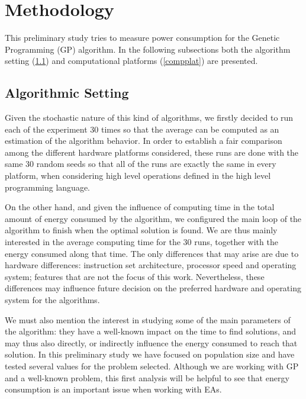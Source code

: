 \section{Methodology}
\label{methodology}

This preliminary study tries to measure power consumption for 
the Genetic Programming (GP) algorithm. In the following subsections
both the algorithm setting (\ref{algsetting}) and computational
platforms (\ref{compplat}) are presented. 

\subsection{Algorithmic Setting}
\label{algsetting}

Given the stochastic nature of this kind of algorithms, we firstly
decided to run each of the experiment 30 times so that the average can
be computed as an estimation of the algorithm behavior. In order to
establish a fair comparison among the different hardware platforms
considered, these runs are done with the same 30 random seeds so that
all of the runs are exactly the same in every platform, when
considering high level operations defined in the high level
programming language. 

On the other hand, and given the influence of computing time in the
total amount of energy consumed by the algorithm, we configured the
main loop of the algorithm to finish when  
the optimal solution is found.  We are thus mainly interested in the
average computing time for the 30 runs, together with the energy
consumed along that time.  The only differences that may arise are due
to hardware differences:  instruction set architecture, processor
speed and operating system;  %
features that are not the focus of this work.  Nevertheless, these
differences may influence future decision on the preferred hardware
and operating system for the algorithms.

We must also mention the interest in studying some of the main
parameters of the algorithm:  they have a well-known impact on the
time to find solutions, and may thus also directly, or indirectly
influence the energy consumed to reach that solution.  In this
preliminary study we have focused on population size and have tested
several values for the problem selected.  Although we are working with
GP and a well-known problem, this first analysis will be helpful to
see that energy consumption is an important issue when working with
EAs. 

